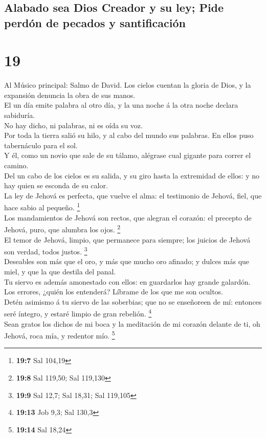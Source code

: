 \hypertarget{alabado-sea-dios-creador-y-su-ley-pide-perduxf3n-de-pecados-y-santificaciuxf3n}{%
\subsection{Alabado sea Dios Creador y su ley; Pide perdón de pecados y
santificación}\label{alabado-sea-dios-creador-y-su-ley-pide-perduxf3n-de-pecados-y-santificaciuxf3n}}

\hypertarget{section-18}{%
\section{19}\label{section-18}}

 Al Músico principal: Salmo de David. Los cielos cuentan la
gloria de Dios, y la expansión denuncia la obra de sus manos.\\
 El un día emite palabra al otro día, y la una noche á la
otra noche declara sabiduría.\\
 No hay dicho, ni palabras, ni es oída su voz.\\
 Por toda la tierra salió su hilo, y al cabo del mundo sus
palabras. En ellos puso tabernáculo para el sol.\\
 Y él, como un novio que sale de su tálamo, alégrase cual
gigante para correr el camino.\\
 Del un cabo de los cielos es su salida, y su giro hasta la
extremidad de ellos: y no hay quien se esconda de su calor.\\
 La ley de Jehová es perfecta, que vuelve el alma: el
testimonio de Jehová, fiel, que hace sabio al pequeño. \footnote{\textbf{19:7}
  Sal 104,19}\\
 Los mandamientos de Jehová son rectos, que alegran el
corazón: el precepto de Jehová, puro, que alumbra los ojos.
\footnote{\textbf{19:8} Sal 119,50; Sal 119,130}\\
 El temor de Jehová, limpio, que permanece para siempre; los
juicios de Jehová son verdad, todos justos. \footnote{\textbf{19:9} Sal
  12,7; Sal 18,31; Sal 119,105}\\
 Deseables son más que el oro, y más que mucho oro afinado;
y dulces más que miel, y que la que destila del panal.\\
 Tu siervo es además amonestado con ellos: en guardarlos
hay grande galardón.\\
 Los errores, ¿quién los entenderá? Líbrame de los que me
son ocultos.\\
 Detén asimismo á tu siervo de las soberbias; que no se
enseñoreen de mí: entonces seré íntegro, y estaré limpio de gran
rebelión. \footnote{\textbf{19:13} Job 9,3; Sal 130,3}\\
 Sean gratos los dichos de mi boca y la meditación de mi
corazón delante de ti, oh Jehová, roca mía, y redentor mío. \footnote{\textbf{19:14}
  Sal 18,24}

